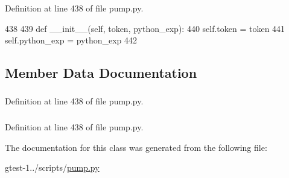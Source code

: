 \-Definition at line 438 of file pump.\-py.


\begin{DoxyCode}
438 
439   def __init__(self, token, python_exp):
440     self.token = token
441     self.python_exp = python_exp
442 

\end{DoxyCode}


\subsection{\-Member \-Data \-Documentation}
\hypertarget{classpump_1_1ExpNode_ad0b70a692b34e003d973e22ef80d0e69}{
\subsubsection[{python\-\_\-exp}]{}}\label{d1/d6a/classpump_1_1ExpNode_ad0b70a692b34e003d973e22ef80d0e69}


\-Definition at line 438 of file pump.\-py.

\hypertarget{classpump_1_1ExpNode_a87da3d8264af1c9427605148f20dd9c4}{
\subsubsection[{token}]{}}\label{d1/d6a/classpump_1_1ExpNode_a87da3d8264af1c9427605148f20dd9c4}


\-Definition at line 438 of file pump.\-py.



\-The documentation for this class was generated from the following file\-:\begin{DoxyCompactItemize}
\item 
gtest-\/1../scripts/\hyperlink{pump_8py}{pump.\-py}\end{DoxyCompactItemize}
